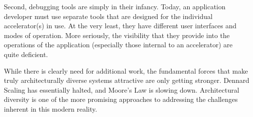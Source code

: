 Second, debugging tools are simply in their infancy. Today, an
application developer must use separate tools that are designed
for the individual accelerator(s) in use.  At the very least, they
have different user interfaces and modes of operation.  More
seriously, the visibility that they provide into the operations
of the application (especially those internal to an accelerator)
are quite deficient.

While there is clearly need for additional work, the fundamental
forces that make truly architecturally diverse systems attractive
are only getting stronger.  Dennard Scaling has essentially halted,
and Moore's Law is slowing down.  Architectural diversity is one
of the more promising approaches to addressing the challenges
inherent in this modern reality.
